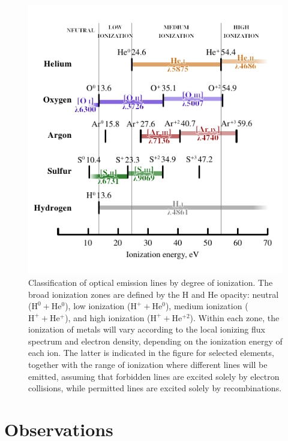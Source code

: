 \documentclass[twocolumn, times]{aastex631}
\newcommand*\chem[1]{\ensuremath{\mathrm{#1}}}
\begin{document}
\begin{figure}
  \centering
  \includegraphics{figs/ionization-potential-table}
  \caption{
    Classification of optical emission lines by degree of ionization.
    The broad ionization zones are defined by the H and He opacity:
    neutral (\(\chem{H^0} + \chem{He^0}\)),
    low ionization (\(\chem{H^+} + \chem{He^0}\)),
    medium ionization (\(\chem{H^+} + \chem{He^+}\)),
    and high ionization (\(\chem{H^+} + \chem{He^{+2}}\)).
    Within each zone, the ionization of metals will
    vary according to the local ionizing flux spectrum
    and electron density,
    depending on the ionization energy of each ion.
    The latter is indicated in the figure for selected elements,
    together with the range of ionization where different lines
    will be emitted, assuming that forbidden lines
    are excited solely by electron collisions,
    while permitted lines are excited solely by recombinations.
   }
  \label{fig:ion-energies}
\end{figure}

\section{Observations}
\label{sec:observations}
\end{document}
